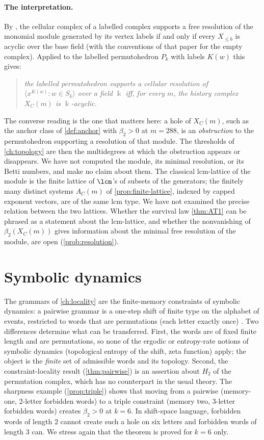 \paragraph{The interpretation.} By \cite[Prop.~1.1]{BayerSturmfels}, the cellular complex of a labelled complex supports a free resolution of the monomial module generated by its vertex labels if and only if every $X_{\le b}$ is acyclic over the base field (with the conventions of that paper for the empty complex). Applied to the labelled permutohedron $P_k$ with labels $K(w)$ this gives:
\begin{quote}
\emph{the labelled permutohedron supports a cellular resolution of $\langle x^{K(w)}:w\in S_k\rangle$ over a field $\Bbbk$ iff, for every $m$, the history complex $X_C(m)$ is $\Bbbk$-acyclic.}
\end{quote}
The converse reading is the one that matters here: a hole of $X_C(m)$, such as the anchor class of \cref{def:anchor} with $\beta_2>0$ at $m=288$, is an \emph{obstruction} to the permutohedron supporting a resolution of that module. The thresholds of \cref{ch:topology} are then the multidegrees at which the obstruction appears or disappears. We have not computed the module, its minimal resolution, or its Betti numbers, and make no claim about them. The classical lcm-lattice of the module \cite{GasharovPeevaWelker} is the finite lattice of $\lcm$'s of subsets of the generators; the finitely many distinct systems $A_C(m)$ of \cref{prop:finite-lattice}, indexed by capped exponent vectors, are of the same lcm type. We have not examined the precise relation between the two lattices. Whether the survival law \cref{thm:AT1} can be phrased as a statement about the lcm-lattice, and whether the nonvanishing of $\beta_2(X_C(m))$ gives information about the minimal free resolution of the module, are open (\cref{prob:resolution}).

\section{Symbolic dynamics}\label{sec:symbolic-dyn}
The grammars of \cref{ch:locality} are the finite-memory constraints of symbolic dynamics: a pairwise grammar is a one-step shift of finite type on the alphabet of events, restricted to words that are permutations (each letter exactly once) \cite{LindMarcus}. Two differences determine what can be transferred. First, the words are of fixed finite length and are permutations, so none of the ergodic or entropy-rate notions of symbolic dynamics (topological entropy of the shift, zeta function) apply; the object is the \emph{finite} set of admissible words and its topology. Second, the constraint-locality result (\cref{thm:pairwise}) is an assertion about $H_2$ of the permutation complex, which has no counterpart in the usual theory. The sharpness example (\cref{prop:triple}) shows that moving from a pairwise (memory-one, 2-letter forbidden words) to a triple constraint (memory two, 3-letter forbidden words) creates $\beta_2>0$ at $k=6$. In shift-space language, forbidden words of length $2$ cannot create such a hole on six letters and forbidden words of length $3$ can. We stress again that the theorem is proved for $k=6$ only.

